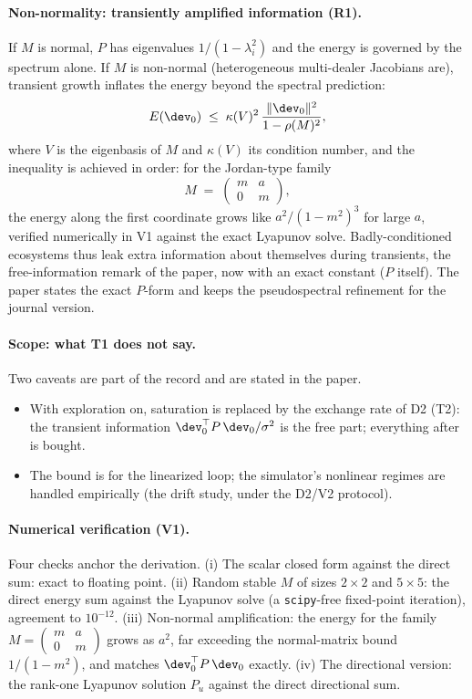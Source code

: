 \paragraph{Non-normality: transiently amplified information (R1).}
If $M$ is normal, $P$ has eigenvalues $1/(1 - \lambda_i^2)$ and the energy
is governed by the spectrum alone. If $M$ is non-normal (heterogeneous
multi-dealer Jacobians are), transient growth inflates the energy beyond the
spectral prediction:
\begin{equation*}
E(\dev_0) \;\le\; \kappa(V)^2\,\frac{\|\dev_0\|^2}{1 - \rho(M)^2},
\end{equation*}
where $V$ is the eigenbasis of $M$ and $\kappa(V)$ its condition number, and
the inequality is achieved in order: for the Jordan-type family
\begin{equation*}
M \;=\; \begin{pmatrix} m & a \\ 0 & m \end{pmatrix},
\end{equation*}
the energy along the first coordinate grows like $a^2/(1 - m^2)^3$ for
large $a$, verified numerically in V1 against the exact Lyapunov solve.
Badly-conditioned ecosystems thus leak extra information about
themselves during transients, the free-information remark of the paper, now
with an exact constant ($P$ itself). The paper states the exact $P$-form and
keeps the pseudospectral refinement for the journal version.

\paragraph{Scope: what T1 does not say.}
Two caveats are part of the record and are stated in the paper.
\begin{itemize}
\item With exploration on, saturation is replaced by the exchange rate of
D2 (T2): the transient information $\dev_0^\top P\,\dev_0 / \sigma^2$ is
the free part; everything after is bought.
\item The bound is for the linearized loop; the simulator's nonlinear
regimes are handled empirically (the drift study, under the D2/V2
protocol).
\end{itemize}

\paragraph{Numerical verification (V1).}
Four checks anchor the derivation. (i) The scalar closed form against the
direct sum: exact to floating point. (ii) Random stable $M$ of sizes
$2 \times 2$ and $5 \times 5$: the direct energy sum against the Lyapunov
solve (a \texttt{scipy}-free fixed-point iteration), agreement to
$10^{-12}$. (iii) Non-normal amplification: the energy for the family
$M = \left(\begin{smallmatrix} m & a \\ 0 & m \end{smallmatrix}\right)$
grows as $a^2$, far exceeding the normal-matrix bound $1/(1 - m^2)$, and
matches $\dev_0^\top P\,\dev_0$ exactly. (iv) The directional version: the
rank-one Lyapunov solution $P_u$ against the direct directional sum.

